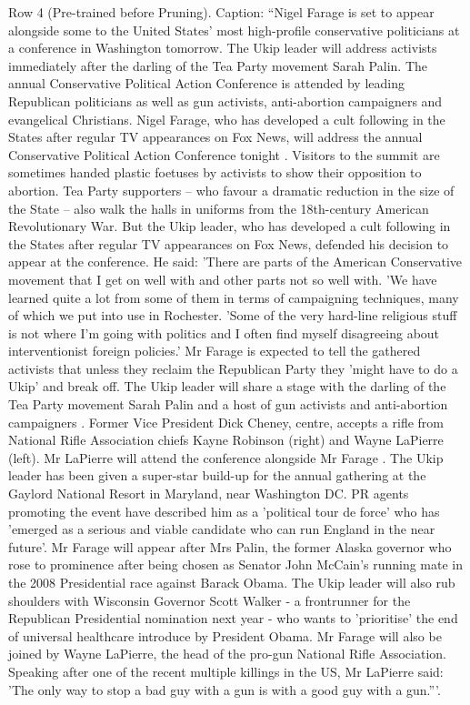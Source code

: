 \begin{table}[H]
\centering
\caption{Row 4 (Pre-trained before Pruning). \ifshowcaption{}Caption: ``Nigel Farage is set to appear alongside some to the United States' most high-profile conservative politicians at a conference in Washington tomorrow. The Ukip leader will address activists immediately after the darling of the Tea Party movement Sarah Palin. The annual Conservative Political Action Conference is attended by leading Republican politicians as well as gun activists, anti-abortion campaigners and evangelical Christians. Nigel Farage, who has developed a cult following in the States after regular TV appearances on Fox News, will address the annual Conservative Political Action Conference tonight . Visitors to the summit are sometimes handed plastic foetuses by activists to show their opposition to abortion. Tea Party supporters – who favour a dramatic reduction in the size of the State – also walk the halls in uniforms from the 18th-century American Revolutionary War. But the Ukip leader, who has developed a cult following in the States after regular TV appearances on Fox News, defended his decision to appear at the conference. He said: 'There are parts of the American Conservative movement that I get on well with and other parts not so well with. 'We have learned quite a lot from some of them in terms of campaigning techniques, many of which we put into use in Rochester. 'Some of the very hard-line religious stuff is not where I'm going with politics and I often find myself disagreeing about interventionist foreign policies.' Mr Farage is expected to tell the gathered activists that unless they reclaim the Republican Party they 'might have to do a Ukip' and break off. The Ukip leader will share a stage with the darling of the Tea Party movement Sarah Palin and a host of gun activists and anti-abortion campaigners . Former Vice President Dick Cheney, centre, accepts a rifle from National Rifle Association chiefs Kayne Robinson (right) and Wayne LaPierre (left). Mr LaPierre will attend the conference alongside Mr Farage . The Ukip leader has been given a super-star build-up for the annual gathering at the Gaylord National Resort in Maryland, near Washington DC. PR agents promoting the event have described him as a 'political tour de force' who has 'emerged as a serious and viable candidate who can run England in the near future'. Mr Farage will appear after Mrs Palin, the former Alaska governor who rose to prominence after being chosen as Senator John McCain's running mate in the 2008 Presidential race against Barack Obama. The Ukip leader will also rub shoulders with Wisconsin Governor Scott Walker - a frontrunner for the Republican Presidential nomination next year - who wants to 'prioritise' the end of universal healthcare introduce by President Obama. Mr Farage will also be joined by Wayne LaPierre, the head of the pro-gun National Rifle Association. Speaking after one of the recent multiple killings in the US, Mr LaPierre said: 'The only way to stop a bad guy with a gun is with a good guy with a gun.'''.\fi}

\end{table}
